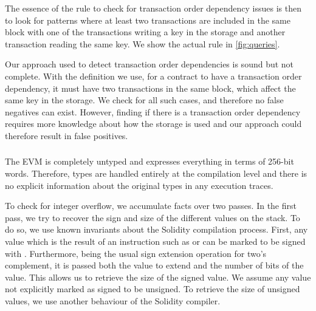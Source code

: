 The essence of the rule to check for transaction order dependency issues is then to look for patterns where at least two transactions are included in the same block with one of the transactions writing a key in the storage and another transaction reading the same key. We show the actual rule in \autoref{fig:queries}.

\correctness Our approach used to detect transaction order dependencies is sound but not complete. With the definition we use, for a contract to have a transaction order dependency, it must have two transactions in the same block, which affect the same key in the storage. We check for all such cases, and therefore no false negatives can exist.
However, finding if there is a transaction order dependency requires more knowledge about how the storage is used and our approach could therefore result in false positives.


\subsubsection{\integeroverflow}
\label{ssec:method-io}

%
The EVM is completely untyped and expresses everything in terms of 256-bit words. Therefore, types are handled entirely at the compilation level and there is no explicit information about the original types in any execution traces.

To check for integer overflow, we accumulate facts over two passes. In the first pass, we try to recover the sign and size of the different values on the stack. To do so, we use known invariants about the Solidity compilation process. First, any value which is the result of an instruction such as  or  can be marked to be signed with . Furthermore,  being the usual sign extension operation for two's complement, it is passed both the value to extend and the number of bits of the value. This allows us to retrieve the size of the signed value. We assume any value not explicitly marked as signed to be unsigned. To retrieve the size of unsigned values, we use another behaviour of the Solidity compiler.

